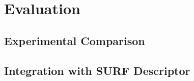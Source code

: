 \section{Evaluation}

\subsection{Experimental Comparison}

\subsection{Integration with SURF Descriptor}